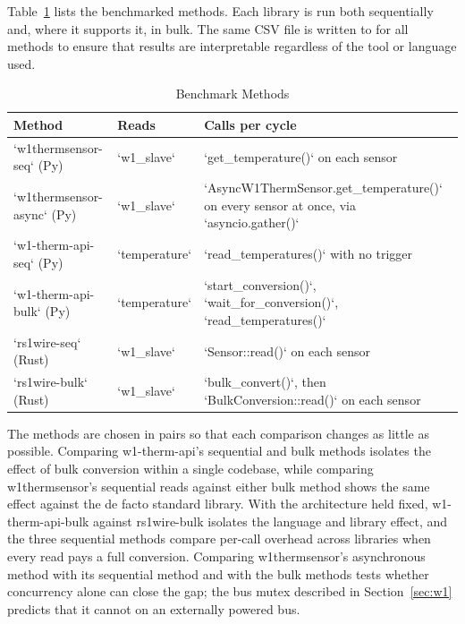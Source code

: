 \documentclass[conference]{IEEEtran}
\begin{document}
Table~\ref{tab:methods} lists the benchmarked methods. 
Each library is run both sequentially and, where it supports it, in bulk. 
The same CSV file is written to for all methods to ensure that results are interpretable regardless of the tool or language used.
\begin{table}[!ht]
\caption{Benchmark Methods}
\begin{center}
\footnotesize
\setlength{\tabcolsep}{4pt}
\begin{tabular}{|p{3.0cm}|p{1.7cm}|p{3.2cm}|}
\hline
\textbf{Method} & \textbf{Reads} & \textbf{Calls per cycle} \\
\hline
`w1thermsensor-seq` (Py) & `w1\_slave` & `get\_temperature()` on each sensor \\
\hline
`w1thermsensor-async` (Py) & `w1\_slave` & `AsyncW1ThermSensor.\allowbreak get\_temperature()` on every sensor at once, via `asyncio.gather()` \\
\hline
`w1-therm-api-seq` (Py) & `temperature` & `read\_temperatures()` with no trigger \\
\hline
`w1-therm-api-bulk` (Py) & `temperature` & `start\_conversion()`, `wait\_for\_conversion()`, `read\_temperatures()` \\
\hline
`rs1wire-seq` (Rust) & `w1\_slave` & `Sensor::read()` on each sensor \\
\hline
`rs1wire-bulk` (Rust) & `w1\_slave` & `bulk\_convert()`, then `BulkConversion::\allowbreak read()` on each sensor \\
\hline
\end{tabular}
\label{tab:methods}
\end{center}
\end{table}

The methods are chosen in pairs so that each comparison changes as little as possible. 
Comparing w1-therm-api's sequential and bulk methods isolates the effect of bulk conversion within a single codebase, while comparing w1thermsensor's sequential reads against either bulk method shows the same effect against the de facto standard library. 
With the architecture held fixed, w1-therm-api-bulk against rs1wire-bulk isolates the language and library effect, and the three sequential methods compare per-call overhead across libraries when every read pays a full conversion. 
Comparing w1thermsensor's asynchronous method with its sequential method and with the bulk methods tests whether concurrency alone can close the gap; the bus mutex described in Section~\ref{sec:w1} predicts that it cannot on an externally powered bus.
\end{document}
